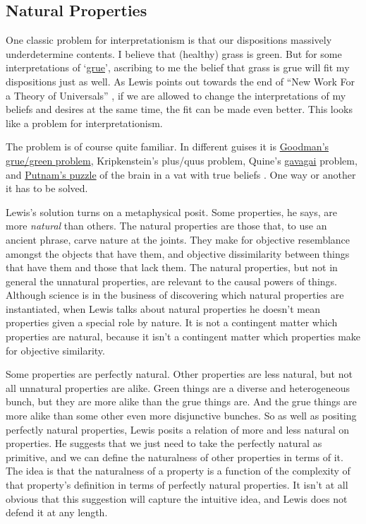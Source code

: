 \subsection{Natural Properties} 
One classic problem for interpretationism is that our dispositions massively underdetermine contents. I believe that (healthy) grass is green. But for some interpretations of `\href{http://plato.stanford.edu/induction-problem/index.html#SomIndPar}{grue}', ascribing to me the belief that grass is grue will fit my dispositions just as well. As Lewis points out towards the end of ``New Work For a Theory of Universals'' \citeyearpar{Lewis1983e}, if we are allowed to change the interpretations of my beliefs and desires at the same time, the fit can be made even better. This looks like a problem for interpretationism.

The problem is of course quite familiar. In different guises it is \href{http://plato.stanford.edu/induction-problem/index.html#SomIndPar}{Goodman's grue/green problem}, Kripkenstein's plus/quus problem, Quine's \href{http://plato.stanford.edu/reference/index.html#NegVieRef}{gavagai} problem, and \href{http://plato.stanford.edu/paradox-skolem/index.html#3.3}{Putnam's puzzle} of the brain in a vat with true beliefs \citep{Goodman1955, Wittgenstein1953, Kripke1982, Quine1960, Putnam1981}. One way or another it has to be solved.

Lewis's solution turns on a metaphysical posit. Some properties, he says, are more \textit{natural} than others. The natural properties are those that, to use an ancient phrase, carve nature at the joints. They make for objective resemblance amongst the objects that have them, and objective dissimilarity between things that have them and those that lack them. The natural properties, but not in general the unnatural properties, are relevant to the causal powers of things. Although science is in the business of discovering which natural properties are instantiated, when Lewis talks about natural properties he doesn't mean properties given a special role by nature. It is not a contingent matter which properties are natural, because it isn't a contingent matter which properties make for objective similarity.

Some properties are perfectly natural. Other properties are less natural, but not all unnatural properties are alike. Green things are a diverse and heterogeneous bunch, but they are more alike than the grue things are. And the grue things are more alike than some other even more disjunctive bunches. So as well as positing perfectly natural properties, Lewis posits a relation of more and less natural on properties. He suggests that we just need to take the perfectly natural as primitive, and we can define the naturalness of other properties in terms of it. The idea is that the naturalness of a property is a function of the complexity of that property's definition in terms of perfectly natural properties. It isn't at all obvious that this suggestion will capture the intuitive idea, and Lewis does not defend it at any length.

